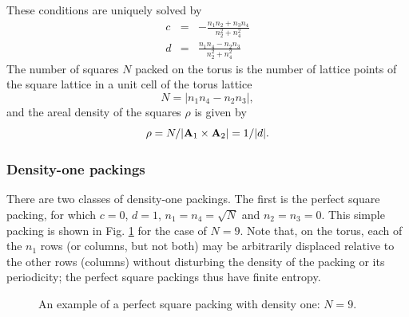 \documentclass[aps]{revtex4}
\newcommand{\Ax}{{\bf A}_1}
\newcommand{\Ay}{{\bf A}_2}
\begin{document}
These conditions are uniquely solved by
\begin{eqnarray}\label{eq:gap}
c &=& - \frac{n_1 n_2 + n_3 n_4}{n_2^2 + n_4^2}\\
d &=& \frac{n_1 n_4 - n_2 n_3}{n_2^2 + n_4^2} \nonumber
\end{eqnarray}
The number of squares $N$ packed on the torus is the number of lattice points of the square lattice in a unit cell of the torus lattice
\begin{equation}
\label{eqn:N}
N = |n_1 n_4 - n_2 n_3|,
\end{equation}
and the areal density of the squares $\rho$ is given by
\begin{equation}
\label{ }
\rho=N/|\Ax \times \Ay| = 1/|d|.
\end{equation}

\subsubsection{Density-one packings}
\label{sec:densityOnePackings}
There are two classes of density-one packings.  The first is the perfect square packing, for which $c=0$, $d=1$, $n_1=n_4=\sqrt{N}$ and $n_2=n_3=0$.  This simple packing is shown in Fig. \ref{fig:N9} for the case of $N=9$.  Note that, on the torus, each of the $n_1$ rows (or columns, but not both) may be arbitrarily displaced relative to the other rows (columns) without disturbing the density of the packing or its periodicity; the perfect square packings thus have finite entropy.

\begin{figure}[h]
\label{fig:N9}
\caption{\label{fig:N9} An example of a perfect square packing with density one: $N=9$.}
\end{figure}
\end{document}
